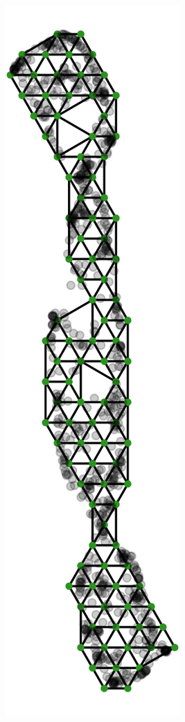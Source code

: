 \documentclass[
  12pt]{article}
\begin{document}
\begin{figure}[H]

\begin{minipage}{0.25\linewidth}
\includegraphics{figures/scurve/sc_best_trimap_trimesh.png}\end{minipage}%

\end{figure}
\end{document}

